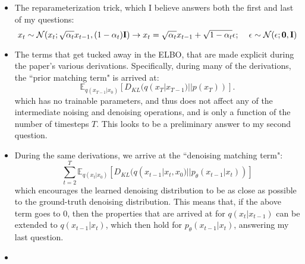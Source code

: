 \documentclass{article}
\begin{document}
\begin{itemize}
\item The reparameterization trick, which I believe answers both the first and last of my questions:
  \[ 
   x_t \sim \mathcal{N}(x_t; \sqrt{\alpha_t}x_{t-1}, (1-\alpha_t)\mathbf{I}) \rightarrow  x_{t} = \sqrt{\alpha_t}x_{t-1} + \sqrt{1 - \alpha_t}\epsilon; \hspace{4mm} \epsilon \sim \mathcal{N}(\epsilon; \mathbf{0}, \mathbf{I})
  \]
  
\item The terms that get tucked away in the ELBO, that are made explicit during the paper's various derivations. Specifically, during many of the derivations, the ``prior matching term" is arrived at:
  \[ 
    \mathbb{E}_{q(x_{T-1} | x_0)}[D_{KL}(q(x_T|x_{T-1}) || p(x_T))]
  .\]
  which has no trainable parameters, and thus does not affect any of the intermediate noising and denoising operations, and is only a function of the number of timesteps $T$. This looks to be a preliminary answer to my second question.
\item During the same derivations, we arrive at the ``denoising matching term":
  \[ 
    \sum_{t= 2}^{T} \mathbb{E}_{q(x_t | x_0)}[D_{KL}(q(x_{t-1}|x_t, x_0) || p_\theta(x_{t-1}|x_t))]
  \]
 which encourages the learned denoising distribution to be as close as possible to the ground-truth denoising distribution. This means that, if the above term goes to 0, then the properties that are arrived at for $q(x_t | x_{t-1})$ can be extended to $q(x_{t-1} | x_t)$, which then hold for $p_\theta(x_{t-1} | x_t)$, answering my last question.
\item 
\end{itemize}
\end{document}
